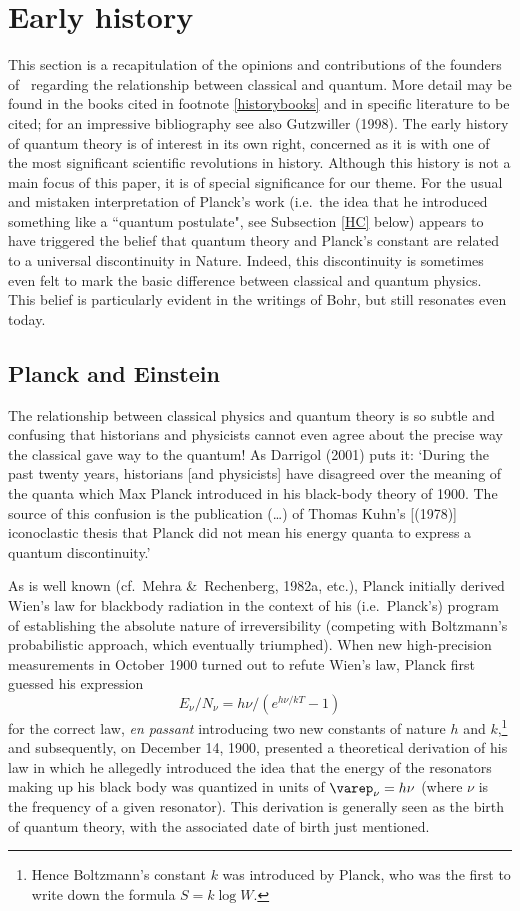 \documentclass[12pt,titlepage]{article}
\newcommand{\beq}{\begin{equation}}
\newcommand{\eeq}{\end{equation}}
\begin{document}
\section{Early history}\label{S2}
This section is a recapitulation of the opinions and contributions of the founders of \qm\ regarding  the relationship between classical and quantum. More detail may be found in the books cited in footnote  \ref{historybooks} and in specific literature to be cited; for an impressive bibliography see also Gutzwiller (1998). 
The early history of quantum theory is of interest in its own right, concerned as it is with one of the most significant scientific revolutions in history. Although this history is not a main focus of this paper,  it is of special significance for our theme. For the usual and mistaken interpretation of Planck's work 
(i.e.\ the idea that he introduced something like a ``quantum postulate", see Subsection \ref{HC} below) 
appears to have triggered the   belief that quantum theory and Planck's constant are related to a universal discontinuity in Nature. Indeed, this discontinuity is sometimes even felt to  mark the basic difference between classical and quantum physics. This belief is particularly evident in the writings of Bohr, but still resonates even today. 
\subsection{Planck and Einstein}
The relationship between classical physics and quantum theory is so subtle and confusing that historians and physicists cannot even agree about the precise way the classical gave way to the quantum! 
 As Darrigol (2001) puts it: `During the past twenty years, historians [and physicists] have disagreed over the meaning of the quanta which Max Planck introduced in his black-body theory of 1900. The source of this confusion is the publication (\ldots) of Thomas Kuhn's [(1978)] iconoclastic thesis that Planck did not mean his energy quanta to express a quantum discontinuity.' 

As is well known (cf.\ Mehra \&\ Rechenberg, 1982a, etc.), Planck initially derived Wien's law for blackbody radiation in the context  of his (i.e.\ Planck's) program of establishing the absolute nature of irreversibility (competing with  Boltzmann's probabilistic approach, which eventually triumphed). When new high-precision measurements in October 1900 turned out to refute Wien's law, Planck first guessed his  expression 
\beq  E_{\nu}/N_{\nu}=h\nu/(e^{h\nu/kT}-1) \label{Planck}\eeq
for the correct law,  \textit{en passant} introducing two new constants of nature $h$ and $k$,\footnote{Hence Boltzmann's constant $k$ was introduced by Planck, who was the first to write down the formula $S= k\log W$.} and subsequently, on December 14, 1900, presented a theoretical derivation of his law in which he allegedly introduced the idea that the energy of the resonators making up his black body was quantized in units of $\varep_{\nu}=h\nu$ (where $\nu$ is the frequency of a given resonator). This derivation is generally seen as the birth of quantum theory, with the associated date of birth just mentioned. 
\end{document}
